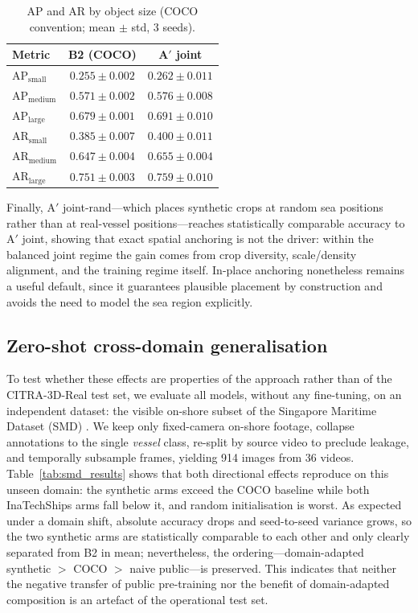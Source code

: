 \documentclass[10pt,conference]{IEEEtran}
\begin{document}
\begin{table}[!t]
\renewcommand{\arraystretch}{1.15}
\caption{AP and AR by object size (COCO convention; mean $\pm$ std, 3 seeds).}
\label{tab:size}
\centering
\footnotesize
\setlength{\tabcolsep}{6pt}
\begin{tabular}{@{}lcc@{}}
\toprule
Metric & B2 (COCO) & A$'$ joint \\
\midrule
$\text{AP}_\text{small}$  & $0.255 \pm 0.002$ & $0.262 \pm 0.011$ \\
$\text{AP}_\text{medium}$ & $0.571 \pm 0.002$ & $0.576 \pm 0.008$ \\
$\text{AP}_\text{large}$  & $0.679 \pm 0.001$ & $0.691 \pm 0.010$ \\
$\text{AR}_\text{small}$  & $0.385 \pm 0.007$ & $0.400 \pm 0.011$ \\
$\text{AR}_\text{medium}$ & $0.647 \pm 0.004$ & $0.655 \pm 0.004$ \\
$\text{AR}_\text{large}$  & $0.751 \pm 0.003$ & $0.759 \pm 0.010$ \\
\bottomrule
\end{tabular}
\end{table}

Finally, A$'$ joint-rand---which places synthetic crops at random sea positions
rather than at real-vessel positions---reaches statistically comparable accuracy
to A$'$ joint, showing that exact spatial anchoring is not the driver: within the
balanced joint regime the gain comes from crop diversity, scale/density
alignment, and the training regime itself. In-place anchoring nonetheless remains
a useful default, since it guarantees plausible placement by construction and
avoids the need to model the sea region explicitly.

\subsection{Zero-shot cross-domain generalisation}
\label{subsec:zeroshot}

To test whether these effects are properties of the approach rather than of the
CITRA-3D-Real test set, we evaluate all models, without any fine-tuning, on an
independent dataset: the visible on-shore subset of the Singapore Maritime
Dataset (SMD) \cite{prasad2017video}. We keep only fixed-camera on-shore footage,
collapse annotations to the single \emph{vessel} class, re-split by source video
to preclude leakage, and temporally subsample frames, yielding 914 images from 36
videos. Table~\ref{tab:smd_results} shows that both directional effects reproduce on this
unseen domain: the synthetic arms exceed the COCO baseline while both InaTechShips
arms fall below it, and random initialisation is worst. As expected under a domain
shift, absolute accuracy drops and seed-to-seed variance grows, so the two
synthetic arms are statistically comparable to each other and only clearly
separated from B2 in mean; nevertheless, the ordering---domain-adapted synthetic
$>$ COCO $>$ naive public---is preserved. This indicates that neither the negative
transfer of public pre-training nor the benefit of domain-adapted composition is
an artefact of the operational test set.
\end{document}
